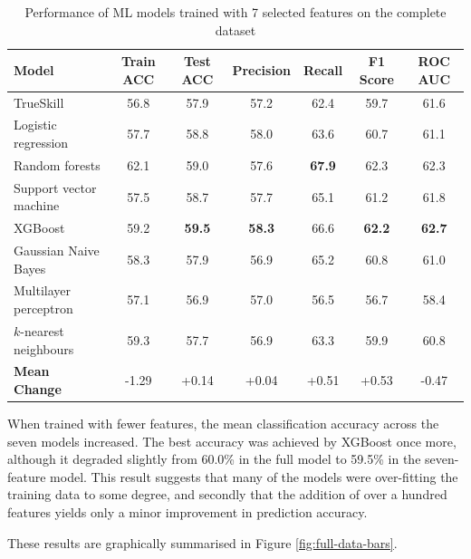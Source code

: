 \begin{table}[h!]
	\centering
	\small
	\begin{adjustbox}{center} %
		\begin{tabular}{ |l|c|c|c|c|c|c| }
			\hline
			\rule{0pt}{2.6ex} \textbf{Model} & \textbf{Train ACC} & \textbf{Test ACC} & \textbf{Precision} & \textbf{Recall} & \textbf{F1 Score} & \textbf{ROC AUC} \\
			\hline
			\rule{0pt}{2.6ex} TrueSkill                 & 56.8 & 57.9 & 57.2 & 62.4 & 59.7 & 61.6 \\ \hline
			\rule{0pt}{2.6ex} Logistic regression 		& 57.7 & 58.8 & 58.0 & 63.6 & 60.7 & 61.1 \\
			\rule{0pt}{2.6ex} Random forests			& 62.1 & 59.0 & 57.6 & \textbf{67.9} & 62.3 & 62.3 \\
			\rule{0pt}{2.6ex} Support vector machine 	& 57.5 & 58.7 & 57.7 & 65.1 & 61.2 & 61.8 \\
			\rule{0pt}{2.6ex} XGBoost 					& 59.2 & \textbf{59.5} & \textbf{58.3} & 66.6 & \textbf{62.2} & \textbf{62.7} \\
			\rule{0pt}{2.6ex} Gaussian Naive Bayes 		& 58.3 & 57.9 & 56.9 & 65.2 & 60.8 & 61.0 \\
			\rule{0pt}{2.6ex} Multilayer perceptron     & 57.1 & 56.9 & 57.0 & 56.5 & 56.7 & 58.4 \\
			\rule{0pt}{2.6ex} $k$-nearest neighbours 	& 59.3 & 57.7 & 56.9 & 63.3 & 59.9 & 60.8 \\
			\hline
			\rule{0pt}{2.6ex} \textbf{Mean Change} 		& -1.29 & +0.14 & +0.04 & +0.51 & +0.53 & -0.47 \\
			\hline
		\end{tabular}
	\end{adjustbox}
	\caption{Performance of ML models trained with 7 selected features on the complete dataset}
	\label{table:7features}
\end{table}

When trained with fewer features, the mean classification accuracy across the seven models increased. The best accuracy was achieved by XGBoost once more, although it degraded slightly from 60.0\% in the full model to 59.5\% in the seven-feature model. This result suggests that many of the models were over-fitting the training data to some degree, and secondly that the addition of over a hundred features yields only a minor improvement in prediction accuracy.

These results are graphically summarised in Figure \ref{fig:full-data-bars}.

